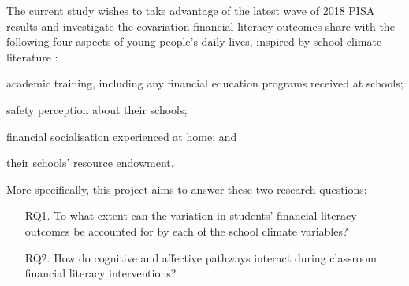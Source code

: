 \documentclass[a4paper,11pt,UKenglish,twoside,openright]{report}\usepackage[]{graphicx}\usepackage[]{color}
\begin{document}
The current study wishes to take advantage of the latest wave of 2018 PISA results and investigate the covariation financial literacy outcomes share with the following four aspects of young people's daily lives, inspired by school climate literature \parencite{wang:2016}:
\begin{enumerate*}[label={(\alph*)}]
    \item academic training, including any financial education programs received at schools;
    \item safety perception about their schools;
    \item financial socialisation experienced at home; and
    \item their schools' resource endowment.
\end{enumerate*}
More specifically, this project aims to answer these two research questions:
\begin{enumerate}
    \item[RQ1.] To what extent can the variation in students' financial literacy outcomes be accounted for by each of the school climate variables?
    \item[RQ2.] How do cognitive and affective pathways interact during classroom financial literacy interventions?
\end{enumerate}




\newpage
\end{document}
